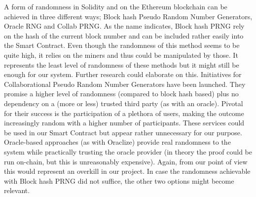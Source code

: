 A form of randomness in Solidity and on the Ethereum blockchain can be achieved in three different ways; Block hash Pseudo Random Number Generators, Oracle RNG and Collab PRNG.
As the name indicates, Block hash PRNG rely on the hash of the current block number and can be included rather easily into the Smart Contract. Even though the randomness of this method seems to be quite high, it relies on the miners and thus could be manipulated by those. It represents the least level of randomness of these methods but it might still be enough for our system. Further research could elaborate on this.
Initiatives for Collaborational Pseudo Random Number Generators have been launched. They promise a higher level of randomness (compared to block hash based) plus no dependency on a (more or less) trusted third party (as with an oracle). Pivotal for their success is the participation of a plethora of users, making the outcome increasingly random with a higher number of participants. These services could be used in our Smart Contract but appear rather unnecessary for our purpose.
Oracle-based approaches (as with Oraclize) provide real randomness to the system while practically trusting the oracle provider (in theory the proof could be run on-chain, but this is unreasonably expensive). Again, from our point of view this would represent an overkill in our project.
In case the randomness achievable with Block hash PRNG did not suffice, the other two options might become relevant.


\newpage
